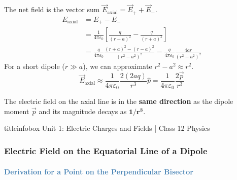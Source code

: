 \begin{frame}
\begin{frame}
\begin{formulabox}
\vspace{0.1cm}
The net field is the vector sum $\vec{E}_{\text{axial}} = \vec{E}_{+} + \vec{E}_{-}$.
\begin{align*}
E_{\text{axial}} &= E_{+} - E_{-} \\
&= \frac{1}{4\pi\varepsilon_0} \left[ \frac{q}{(r-a)^2} - \frac{q}{(r+a)^2} \right] \\
&= \frac{q}{4\pi\varepsilon_0} \frac{(r+a)^2 - (r-a)^2}{(r^2-a^2)^2} = \frac{q}{4\pi\varepsilon_0} \frac{4ar}{(r^2-a^2)^2}
\end{align*}
For a short dipole ($r \gg a$), we can approximate $r^2-a^2 \approx r^2$.
\begin{equation*}
\boxed{\vec{E}_{\text{axial}} \approx \frac{1}{4\pi\varepsilon_0} \frac{2(2aq)}{r^3} \hat{p} = \frac{1}{4\pi\varepsilon_0} \frac{2\vec{p}}{r^3}}
\end{equation*}
\end{formulabox}

\vspace{0.3cm}

\begin{importantbox}
\vspace{0.1cm}
The electric field on the axial line is in the \textbf{same direction} as the dipole moment $\vec{p}$ and its magnitude decays as $\mathbf{1/r^3}$.
\vspace{0.1cm}
\end{importantbox}

\vfill

\begin{beamercolorbox}[wd=\textwidth,ht=0.5cm,dp=0.1cm,center]{titleinfobox}
    \small\color{coolgray} Unit 1: Electric Charges and Fields | Class 12 Physics
\end{beamercolorbox}
\end{frame}

\begin{frame}
\frametitle{\textsf{\textbf{Electric Field on the Equatorial Line of a Dipole}}}
\framesubtitle{\textcolor{steelblue}{Derivation for a Point on the Perpendicular Bisector}}


\end{frame}
\end{frame}
